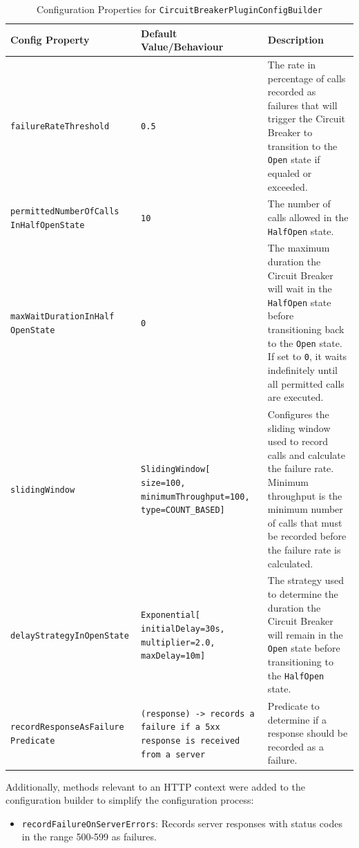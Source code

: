 \begin{table}[!htb]
    \centering
    \caption{Configuration Properties for \texttt{CircuitBreakerPluginConfigBuilder}}
    \label{tab:circuit-breaker-config-builder}
    \vspace{0.3cm}
    \begin{tabular}{|p{5cm}|p{5cm}|p{6cm}|}
        \hline
        \textbf{Config Property}                   & \textbf{Default Value/Behaviour}                                                     & \textbf{Description}                                                                                                                                        \\ \hline
        \texttt{failureRateThreshold}              & \texttt{0.5}                                                                         & The rate in percentage of calls recorded as failures that will trigger the Circuit Breaker to transition to the \texttt{Open} state if equaled or exceeded. \\ \hline
        \texttt{permittedNumberOfCalls InHalfOpenState} & \texttt{10} & The number of calls
        allowed in the \texttt{HalfOpen} state. \\ \hline
        \texttt{maxWaitDurationInHalf OpenState} & \texttt{0} & The maximum duration
        the Circuit Breaker will wait in the \texttt{HalfOpen} state before transitioning back to the \texttt{Open} state.
        If set to \texttt{0}, it waits indefinitely until all permitted calls are executed. \\ \hline
        \texttt{slidingWindow} & \texttt{SlidingWindow[ size=100, minimumThroughput=100, type=COUNT\_BASED]}
        & Configures the sliding window used to record calls and calculate the failure rate.
        Minimum throughput is the minimum number of calls
        that must be recorded before the failure rate is calculated.
        \\ \hline
        \texttt{delayStrategyInOpenState}          & \texttt{Exponential[ initialDelay=30s, multiplier=2.0, maxDelay=10m]}     & The strategy used to determine the duration the Circuit Breaker will remain in the \texttt{Open} state before transitioning to the \texttt{HalfOpen} state. \\ \hline
        \texttt{recordResponseAsFailure Predicate} & \texttt{(response) -> records a failure if a 5xx response is received from a server}                               & Predicate to determine if a response should be recorded as a failure.                                   \\ \hline
    \end{tabular}
\end{table}

Additionally, methods relevant to an HTTP context were added to the configuration builder to simplify the configuration process:

\begin{itemize}
    \item \texttt{recordFailureOnServerErrors}: Records server responses with status codes in the range 500-599 as failures.
\end{itemize}
